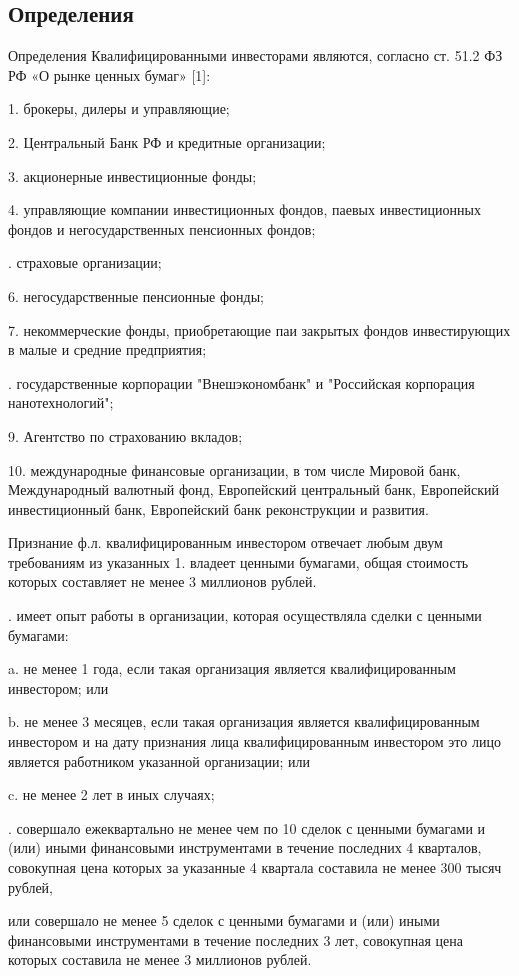 \documentclass[_Venture_p1.tex]{subfiles}
\begin{document}

\subsection{Определения}
\begin{frame}[allowframebreaks]{Определения}
Квалифицированными инвесторами являются, согласно ст. 51.2 ФЗ РФ «О рынке ценных бумаг» [1]:

1.	брокеры, дилеры и управляющие; 

2.	Центральный Банк РФ и кредитные организации;

3.	акционерные инвестиционные фонды;

4.	управляющие компании инвестиционных фондов, паевых инвестиционных фондов и негосударственных пенсионных фондов;

.	страховые организации;

6.	негосударственные пенсионные фонды;

7.	некоммерческие фонды, приобретающие паи закрытых фондов инвестирующих в малые и средние предприятия;

.	государственные корпорации "Внешэкономбанк" и "Российская корпорация нанотехнологий";

9.	Агентство по страхованию вкладов;

10.	международные финансовые организации, в том числе Мировой банк, Международный валютный фонд, Европейский центральный банк, Европейский инвестиционный банк, Европейский банк реконструкции и развития.

\end{frame}

\begin{frame}[allowframebreaks]{\setfontsize{12pt}Признание ф.л. квалифицированным инвестором }{отвечает любым двум требованиям из указанных}
1.	владеет ценными бумагами, общая стоимость которых составляет не менее 3 миллионов рублей. 

.	имеет опыт работы в организации, которая осуществляла сделки с ценными бумагами:

a.	не менее 1 года, если такая организация является квалифицированным инвестором; или

b.	не менее 3 месяцев, если такая организация является квалифицированным инвестором и на дату признания лица квалифицированным инвестором это лицо является работником указанной организации; или

c.	не менее 2 лет в иных случаях;

.	совершало ежеквартально не менее чем по 10 сделок с ценными бумагами и (или) иными финансовыми инструментами в течение последних 
4 кварталов, совокупная цена которых за указанные 4 квартала составила не менее 300 тысяч рублей, 

или совершало не менее 5 сделок с ценными бумагами и (или) иными финансовыми инструментами в течение последних 3 лет, совокупная цена которых составила не менее 3 миллионов рублей.

\end{frame}
\end{document}
